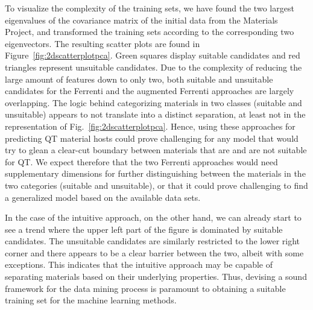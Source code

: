 \documentclass[superscriptaddress,unsortedaddress,
 amsmath,amssymb,
 aps,
]{revtex4-2}
\begin{document}
To visualize the complexity of the training sets, we have found the two largest eigenvalues of the covariance matrix \cite{Hastie2009} of the initial data from the Materials Project, and transformed the training sets according to the corresponding two eigenvectors. The resulting scatter plots are found in Figure~\ref{fig:2dscatterplotpca}. 
Green squares display suitable candidates and red triangles represent unsuitable candidates. Due to the complexity of reducing the large amount of features down to only two, both suitable and unsuitable candidates for the Ferrenti and the augmented Ferrenti approaches are largely overlapping. 
The logic behind categorizing materials in  two classes (suitable and unsuitable) appears to not translate into a distinct separation, at least not in the representation of Fig.~\ref{fig:2dscatterplotpca}. 
Hence, using these approaches for predicting QT material hosts could prove challenging for any model that would try to glean a clear-cut boundary between materials that are and are not suitable for QT. 
We expect therefore that the two Ferrenti approaches would need supplementary dimensions for further distinguishing between the materials in the two categories (suitable and unsuitable), or that it could prove challenging to find a generalized model based on the available data sets.  

In the case of the intuitive approach, on the other hand, we can already start to see a trend where the upper left part of the figure is dominated by suitable candidates. The unsuitable candidates are similarly restricted to the lower right corner and there appears to be a clear barrier between the two, albeit with some exceptions. This indicates that the intuitive approach may be capable of separating materials based on their underlying properties.  
Thus, devising a sound framework for the data mining process is paramount to obtaining a suitable training set for the machine learning methods. 
\end{document}

